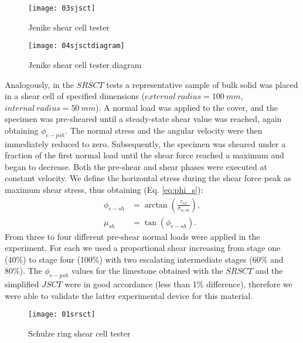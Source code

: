 \documentclass{CFD2015}
\begin{document}
\begin{figure}[!htb] 
\centering 
\texttt{[image: 03sjsct]} 
\caption[simplified JSCT]{Jenike shear cell tester \cite{RefWorks:118}}
\label{fig:03sjsct} 
\end{figure}

\begin{figure}[!htb] 
\centering 
\texttt{[image: 04sjsctdiagram]} 
\caption[Sjsct diagram]{Jenike shear cell tester diagram \cite{RefWorks:118}}
\label{fig:04sjsctdiagram} 
\end{figure}

Analogously, in the $SRSCT$ tests a representative sample of bulk solid was placed in a shear cell of specified dimensions ($external ~ radius = 100 ~ mm$, $internal ~ radius = 50 ~ mm$). A normal load was applied to the cover, and the specimen was pre-sheared  until a steady-state shear value was reached, again obtaining $\phi_{e-psh}$. 
The normal stress and the angular velocity were then immediately reduced to zero. 
Subsequently, the specimen was sheared under a fraction of the first normal load until the shear force reached a maximum and began to decrease. Both the pre-shear and shear phases were executed at constant velocity. We define the horizontal stress during the shear force peak as maximum shear stress, thus obtaining (Eq. \ref{eq:phi_s})\cite{RefWorks:118}:
\begin{equation}
\begin{aligned}
\phi_{e-sh} &= \arctan \left(\frac{\tau_{sh}}{\sigma_{n,sh}} \right) ,\\
\mu_{sh} &= \tan(\phi_{e-sh}) .
\end{aligned}
 \label{eq:phi_s}
\end{equation}
From three to four different pre-shear normal loads were applied in the experiment. For each we used
a proportional shear increasing from stage one (40\%) to stage four (100\%) with two escalating intermediate stages (60\% and 80\%).
The $\phi_{e-psh}$ values for the limestone obtained with the $SRSCT$ and the simplified $JSCT$ were in good accordance (less than 1\% difference), therefore we were able to validate the latter experimental device for this material.\\

\begin{figure}[!htb] 
\centering 
\texttt{[image: 01srsct]} 
\caption[Srsct]{Schulze ring shear cell tester \cite{RefWorks:118}}
\label{fig:01srsct} 
\end{figure}
\end{document}
